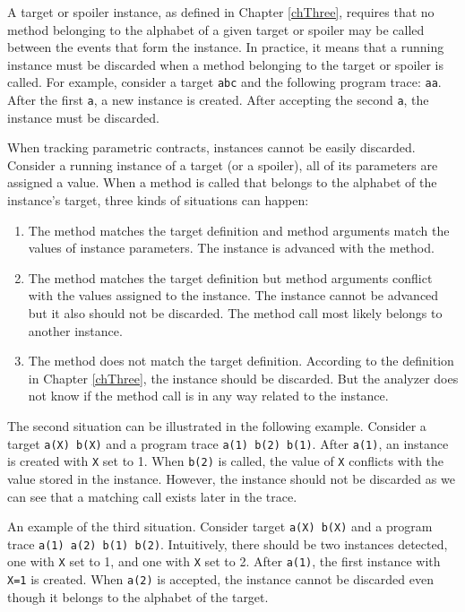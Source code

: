 A target or spoiler instance, as defined in Chapter \ref{chThree}, requires that
no method belonging to the alphabet of a given target or spoiler may be called
between the events that form the instance. In practice, it means that a running
instance must be discarded when a method belonging to the target or spoiler is
called. For example, consider a target \texttt{abc} and the following program
trace: \texttt{aa}. After the first \texttt{a}, a new instance is created. After
accepting the second \texttt{a}, the instance must be discarded.

When tracking parametric contracts, instances cannot be easily discarded.
Consider a running instance of a target (or a spoiler), all of its parameters
are assigned a value. When a method is called that belongs to the alphabet of
the instance's target, three kinds of situations can happen:
\begin{enumerate}
    \item The method matches the target definition and method arguments match
        the values of instance parameters. The instance is advanced with the
        method.
    \item The method matches the target definition but method arguments conflict
        with the values assigned to the instance. The instance cannot be
        advanced but it also should not be discarded. The method call most
        likely belongs to another instance.
    \item The method does not match the target definition. According to the
        definition in Chapter \ref{chThree}, the instance should be discarded.
        But the analyzer does not know if the method call is in any way related
        to the instance.
\end{enumerate}

The second situation can be illustrated in the following example. Consider a
target \texttt{a(X) b(X)} and a program trace \texttt{a(1) b(2) b(1)}. After
\texttt{a(1)}, an instance is created with \texttt{X} set to 1. When
\texttt{b(2)} is called, the value of \texttt{X} conflicts with the value
stored in the instance. However, the instance should not be discarded as we can
see that a matching call exists later in the trace.

An example of the third situation. Consider target \texttt{a(X) b(X)} and a
program trace \texttt{a(1) a(2) b(1) b(2)}. Intuitively, there should be two
instances detected, one with \texttt{X} set to 1, and one with \texttt{X} set to
2. After \texttt{a(1)}, the first instance with \texttt{X=1} is created. When
\texttt{a(2)} is accepted, the instance cannot be discarded even though it
belongs to the alphabet of the target.

